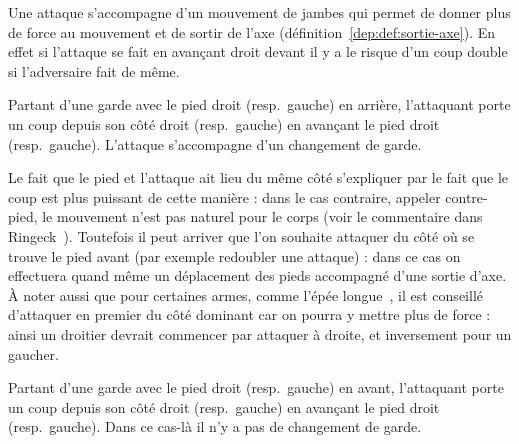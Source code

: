 
Une attaque s'accompagne d'un mouvement de jambes qui permet de donner plus de force au mouvement et de sortir de l'axe (définition~\ref{dep:def:sortie-axe}).
En effet si l'attaque se fait en avançant droit devant il y a le risque d'un coup double si l'adversaire fait de même.


\begin{coup}
\label{att:coup:attaque-normale}

Partant d'une garde avec le pied droit (resp.\ gauche) en arrière, l'attaquant porte un coup depuis son côté droit (resp.\ gauche) en avançant le pied droit (resp.\ gauche).
L'attaque s'accompagne d'un changement de garde.
\end{coup}

Le fait que le pied et l'attaque ait lieu du même côté s'expliquer par le fait que le coup est plus puissant de cette manière : dans le cas contraire, appeler contre-pied, le mouvement n'est pas naturel pour le corps (voir le commentaire dans Ringeck~\cite[p.~7]{farrell:ringeck}).
Toutefois il peut arriver que l'on souhaite attaquer du côté où se trouve le pied avant (par exemple redoubler une attaque) : dans ce cas on effectuera quand même un déplacement des pieds accompagné d'une sortie d'axe.
À noter aussi que pour certaines armes, comme l'épée longue~\cite[p.~10]{farrell:ringeck}, il est conseillé d'attaquer en premier du côté dominant car on pourra y mettre plus de force : ainsi un droitier devrait commencer par attaquer à droite, et inversement pour un gaucher.


\begin{coup}
\label{att:coup:attaque-même-côté}

Partant d'une garde avec le pied droit (resp.\ gauche) en avant, l'attaquant porte un coup depuis son côté droit (resp.\ gauche) en avançant le pied droit (resp.\ gauche).
Dans ce cas-là il n'y a pas de changement de garde.
\end{coup}


